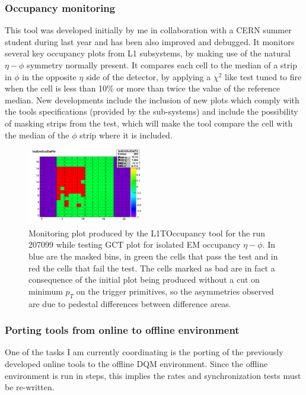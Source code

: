 \documentclass[%
reprint,
amsmath,
amssymb,
aps,
pra,
showkeys
]{revtex4-1}
\begin{document}
\subsubsection{Occupancy monitoring}

This tool was developed initially by me in collaboration with a CERN summer student during last year and has been
also improved and debugged. It monitors several key occupancy plots from L1 subsystems, by making use of the natural
$\eta-\phi$ symmetry normally present. It compares each cell to the median of a strip in $\phi$ in the opposite $\eta$
side of the detector, by applying a $\chi^{2}$ like test tuned to fire when the cell is less than 10\% or more than
twice the value of the reference median. New developments include the inclusion of new plots which comply with the
tools specifications (provided by the sub-systems) and include the possibility of masking strips from the test, which 
will make the tool compare the cell with the median of the $\phi$ strip where it is included.

\begin{figure}[ht]
\centering
\includegraphics[width=0.45\textwidth]{img/L1TOccupancy_IsoEmOccEtaPhi.png}
\caption{Monitoring plot produced by the L1TOccupancy tool for the run 207099 while testing GCT plot for isolated
EM occupancy $\eta-\phi$. In blue are the masked bins, in green the cells that pass the test and in red the cells
that fail the test. The cells marked as bad are in fact a consequence of the initial plot being produced without
a cut on minimum $p_T$ on the trigger primitives, so the asymmetries observed are due to pedestal differences between
difference areas.}
\label{figure_ServiceWork_L1TOccupancy}
\end{figure}


\subsubsection{Porting tools from online to offline environment}

One of the tasks I am currently coordinating is the porting of the previously developed online tools to the offline DQM
environment. Since the offline environment is run in steps, this implies the rates and synchronization tests must be
re-written.



\end{document}
